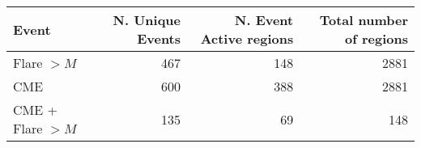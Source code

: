 \begin{tabular}{lrrr}
\toprule
Event & N. Unique Events & N. Event Active regions & Total number of regions \\
\midrule
Flare $>M$ & 467 & 148 & 2881 \\
CME & 600 & 388 & 2881 \\
CME + Flare $>M$ & 135 & 69 & 148 \\
\bottomrule
\end{tabular}
